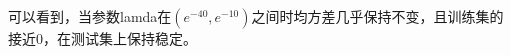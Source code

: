 \documentclass[lang=cn,a4paper,cite=authoryear]{elegantpaper}
\begin{document}
\begin{figure}[H]
{\begin{minipage}[t]{0.5\linewidth}
		\end{minipage}%
	}%
	\quad
{}%
%

\centering
\end{figure}
可以看到，当参数lamda在$\left(e^{-40}, e^{-10}\right)$之间时均方差几乎保持不变，且训练集的接近0，在测试集上保持稳定。
\end{document}
